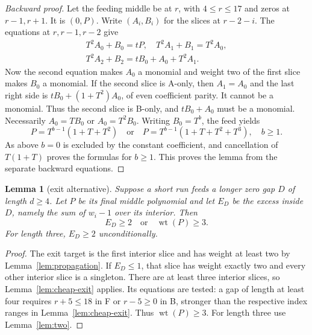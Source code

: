 \documentclass{article}
\newtheorem{lemma}{Lemma}
\DeclareMathOperator{\wt}{wt}
\begin{document}
\begin{proof}[Backward proof]
  Let the feeding middle be at \(r\), with \(4 \le r \le 17\) and zeros at \(r - 1, r + 1\). It is
  \((0, P)\). Write \((A_i, B_i)\) for the slices at \(r - 2 - i\). The equations at
  \(r, r - 1, r - 2\) give
  \begin{equation}\label{eq:cheap-backward}
    \begin{gathered}
      T^2 A_0 + B_0 = tP, \quad T^2 A_1 + B_1 = T^2 A_0, \\
      T^2 A_2 + B_2 = t B_0 + A_0 + T^2 A_1.
    \end{gathered}
  \end{equation}
  Now the second equation makes \(A_0\) a monomial and weight two of the first slice makes \(B_0\)
  a monomial. If the second slice is A-only, then \(A_1 = A_0\) and the last right side is
  \(t B_0 + (1 + T^2)A_0\), of even coefficient parity. It cannot be a monomial. Thus the second
  slice is B-only, and \(t B_0 + A_0\) must be a monomial. Necessarily \(A_0 = T B_0\) or
  \(A_0 = T^2 B_0\). Writing \(B_0 = T^b\), the feed yields
  \begin{equation}
    P = T^{b-1}(1 + T + T^2) \quad \text{or} \quad
    P = T^{b-1}(1 + T + T^2 + T^3), \quad b \ge 1.
  \end{equation}
  As above \(b = 0\) is excluded by the constant coefficient, and cancellation of \(T(1 + T)\)
  proves the formulas for \(b \ge 1\). This proves the lemma from the separate backward
  equations.
\end{proof}

\begin{lemma}[exit alternative]\label{lem:exit-alternative}
  Suppose a short run feeds a longer zero gap \(D\) of length \(d \ge 4\). Let \(P\) be its final
  middle polynomial and let \(E_D\) be the excess inside \(D\), namely the sum of \(w_i - 1\) over
  its interior. Then
  \begin{equation}\label{eq:exit-alternative}
    E_D \ge 2 \quad \text{or} \quad \wt(P) \ge 3.
  \end{equation}
  For length three, \(E_D \ge 2\) unconditionally.
\end{lemma}

\begin{proof}
  The exit target is the first interior slice and has weight at least two by
  Lemma~\ref{lem:propagation}. If \(E_D \le 1\), that slice has weight exactly two and every other
  interior slice is a singleton. There are at least three interior slices, so
  Lemma~\ref{lem:cheap-exit} applies. Its equations are tested: a gap of length at least four
  requires \(r + 5 \le 18\) in F or \(r - 5 \ge 0\) in B, stronger than the respective index
  ranges in Lemma~\ref{lem:cheap-exit}. Thus \(\wt(P) \ge 3\). For length three use
  Lemma~\ref{lem:two}.
\end{proof}
\end{document}
